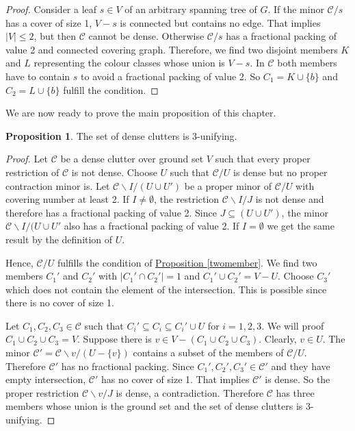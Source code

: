 \documentclass[a4paper, 12pt, twoside=false]{scrbook}
\theoremstyle{definition}
\newtheorem{proposition}[theorem]{Proposition}
\begin{document}
\begin{proof}
       Consider a leaf $s \in V$ of an arbitrary spanning tree of $G$.
       If the minor $\mathcal{C} / s$ has a cover of size 1, $V - s$ is connected but contains no edge.
       That implies $|V| \leq 2$, but then $\mathcal{C}$ cannot be dense.
       Otherwise $\mathcal{C} / s$ has a fractional packing of value 2 and connected covering graph.
       Therefore, we find two disjoint members $K$ and $L$ representing the colour classes whose union is $V-s$.
       In $\mathcal{C}$ both members have to contain $s$ to avoid a fractional packing of value 2.
       So $C_1=K\cup \{b\}$ and $C_2=L\cup \{b\}$ fulfill the condition.
   \end{proof}

   We are now ready to prove the main proposition of this chapter.
   \begin{proposition}
       The set of dense clutters is 3-unifying.
   \end{proposition}

   \begin{proof}
       Let $\mathcal{C}$ be a dense clutter over ground set $V$ such that every proper restriction of $\mathcal{C}$ is not dense.
       Choose $U$ such that $\mathcal{C} / U$ is dense but no proper contraction minor is.
       Let $\mathcal{C} \backslash I / (U \cup U')$ be a proper minor of $\mathcal{C} /U$ with covering number at least 2.
       If $I \neq \emptyset$, the restriction $\mathcal{C} \backslash I / J$ is not dense and therefore has a fractional packing of value 2.
       Since $J \subseteq (U \cup U')$, the minor $\mathcal{C} \backslash I / (U \cup U'$ also has a fractional packing of value 2.
       If $I=\emptyset$ we get the same result by the definition of $U$.

       Hence, $\mathcal{C}/U$ fulfills the condition of \hyperref[twomember]{Proposition \ref*{twomember}}.
       We find two members $C_1'$ and $C_2'$ with $|C_1' \cap C_2'| = 1$ and $C_1' \cup C_2' = V - U$.
       Choose $C_3'$ which does not contain the element of the intersection.
       This is possible since there is no cover of size 1.

       Let $C_1, C_2, C_3 \in \mathcal{C}$ such that $C_i' \subseteq C_i \subseteq C_i' \cup U$ for $i=1,2,3$.
       We will proof $C_1 \cup C_2 \cup C_3 = V$.
       Suppose there is $v \in V-(C_1 \cup C_2 \cup C_3)$.
       Clearly, $v \in U$.
       The minor $\mathcal{C'} = \mathcal{C} \backslash v / (U-\{v\})$ contains a subset of the members of $\mathcal{C}/U$.
       Therefore $\mathcal{C'}$ has no fractional packing.
       Since $C_1', C_2', C_3' \in \mathcal{C'}$ and they have empty intersection, $\mathcal{C'}$ has no cover of size 1.
       That implies $\mathcal{C'}$ is dense.
       So the proper restriction $\mathcal{C}\backslash v / J$ is dense, a contradiction.
       Therefore $\mathcal{C}$ has three members whose union is the ground set and the set of dense clutters is 3-unifying.
   \end{proof}

   \nocite{*}
   \printbibliography[title={References}]
   \printindex
\end{document}
